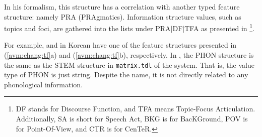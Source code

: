 \noindent In his formalism, this structure has a correlation with
another typed feature structure: namely PRA (PRAgmatics). Information
structure values, such as topics and foci, are gathered into the
lists under PRA{$\mid$}DF{$\mid$}TFA as presented in
\footnote{DF stands for Discourse Function, and
  TFA means Topic-Focus Articulation. Additionally, SA is short for
  Speech Act, BKG is for BacKGround, POV is for Point-Of-View, and CTR
  is for CenTeR.}.


\noindent For example, \nun and \ika in Korean have one of the feature
structures presented in (\ref{avm:chang:tf}a) and
(\ref{avm:chang:tf}b), respectively.  In , the
PHON structure is the same as the STEM structure in
\texttt{matrix.tdl} of the \lingo {} system. That is, the
value type of PHON is just string. Despite the name, it is not
directly related to any 
phonological information.


